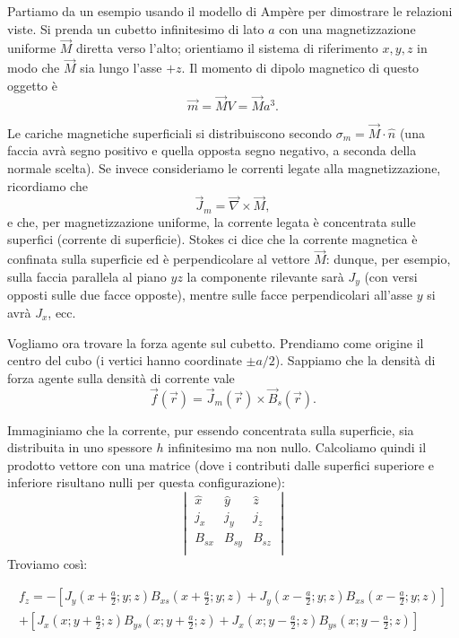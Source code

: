\documentclass{book}
\begin{document}
\medskip

Partiamo da un esempio usando il modello di Ampère per dimostrare le relazioni viste. Si prenda un cubetto infinitesimo di lato \(a\) con una magnetizzazione uniforme \(\vec{M}\) diretta verso l'alto; orientiamo il sistema di riferimento \(x,y,z\) in modo che \(\vec{M}\) sia lungo l'asse \(+z\). Il momento di dipolo magnetico di questo oggetto è
$$
\vec{m}=\vec{M}V=\vec{M}a^3.
$$

Le cariche magnetiche superficiali si distribuiscono secondo \(\sigma_m=\vec{M}\cdot\hat n\) (una faccia avrà segno positivo e quella opposta segno negativo, a seconda della normale scelta). Se invece consideriamo le correnti legate alla magnetizzazione, ricordiamo che
$$
\vec{J}_m = \vec{\nabla}\times\vec{M},
$$
e che, per magnetizzazione uniforme, la corrente legata è concentrata sulle superfici (corrente di superficie). Stokes ci dice che la corrente magnetica è confinata sulla superficie ed è perpendicolare al vettore \(\vec{M}\): dunque, per esempio, sulla faccia parallela al piano \(yz\) la componente rilevante sarà \(J_y\) (con versi opposti sulle due facce opposte), mentre sulle facce perpendicolari all'asse \(y\) si avrà \(J_x\), ecc.

Vogliamo ora trovare la forza agente sul cubetto. Prendiamo come origine il centro del cubo (i vertici hanno coordinate \(\pm a/2\)). Sappiamo che la densità di forza agente sulla densità di corrente vale
$$
\vec{f}(\vec{r})= \vec{J}_m(\vec{r})\times\vec{B}_s(\vec{r}).
$$

Immaginiamo che la corrente, pur essendo concentrata sulla superficie, sia distribuita in uno spessore \(h\) infinitesimo ma non nullo. Calcoliamo quindi il prodotto vettore con una matrice (dove i contributi dalle superfici superiore e inferiore risultano nulli per questa configurazione):
$$
\begin{vmatrix}    
\hat{x} & \hat{y} & \hat{z} \\
j_x & j_y & j_z \\
B_{sx} & B_{sy} & B_{sz} \\
\end{vmatrix}
$$
Troviamo così:

\begin{align*}  
f_z=-[J_y(x+\frac{a}{2};y;z)B_{xs}(x+\frac{a}{2};y;z)+J_y(x-\frac{a}{2};y;z)B_{xs}(x-\frac{a}{2};y;z)] \\
+[J_x(x;y+\frac{a}{2};z)B_{ys}(x;y+\frac{a}{2};z)+J_x(x;y-\frac{a}{2};z)B_{ys}(x;y-\frac{a}{2};z) ]
\end{align*}
\end{document}

